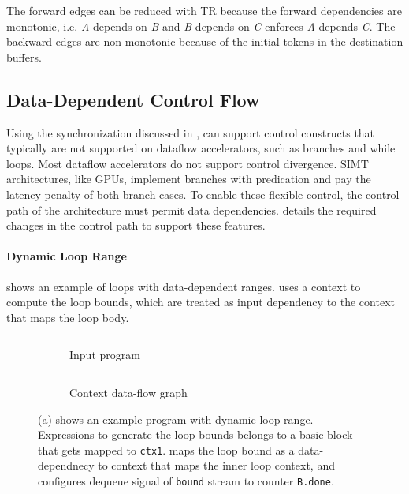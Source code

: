 The forward edges can be reduced with TR because the forward dependencies
are monotonic, i.e. \emph{A} depends on \emph{B} and \emph{B} depends on \emph{C}
enforces \emph{A} depends \emph{C}. The backward edges are non-monotonic because of the initial
tokens in the destination buffers.



\subsection{Data-Dependent Control Flow} \label{sec:datactrl}
Using the synchronization discussed in , \name can support control constructs that 
typically are not supported on dataflow accelerators, such as branches and while loops.
Most dataflow accelerators do not support control divergence. SIMT architectures, like GPUs,
implement branches with predication and pay the latency penalty of both branch cases.
To enable these flexible control, the control path of the architecture must permit data dependencies.
 details the required changes in the control path to support these features.

\paragraph{Dynamic Loop Range}
 shows an example of loops with data-dependent ranges. 
\name uses a context to compute the loop bounds, which are treated as input dependency to the context 
that maps the loop body.
\begin{figure}
\centering
\begin{subfigure}[b]{0.4\textwidth}
\inputminted{python}{code/dynrange.py}
\caption{Input program}
\end{subfigure}
\hfill
\begin{subfigure}[b]{0.5\textwidth}
\inputminted{python}{code/dynrangectx.py}
\caption{Context data-flow graph}
\end{subfigure}
\caption[Example of dynamic loop range]{
  (a) shows an example program with dynamic loop range. 
  Expressions to generate the loop bounds belongs to a basic block that gets mapped to \texttt{ctx1}.
  \name maps the loop bound as a data-dependnecy to context that maps the inner loop context, and
  configures dequeue signal of \texttt{bound} stream to counter \texttt{B.done}.
}
\label{fig:dynrange}
\end{figure}

